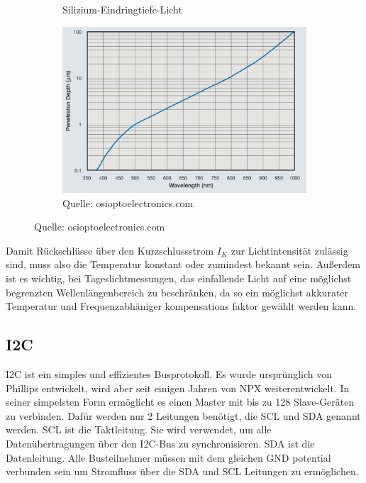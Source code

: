 \begin{figure}[H]
\begin{subfigure}[b]{0.6\textwidth}
    \caption{Silizium-Eindringtiefe-Licht}
    \includegraphics[width=\textwidth]{img/Silizium-Eindringtiefe-Licht.png}
    \caption*{Quelle: osioptoelectronics.com}
  \label{fig:Silizium-eindingtiefe}
  \end{subfigure}
\end{figure}







\noindent Damit Rückschlüsse über den Kurzschlussstrom $I_K$ zur Lichtintensität zulässig sind, muss also die Temperatur konstant oder zumindest bekannt sein.
Außerdem ist es wichtig, bei Tageslichtmessungen, das einfallende Licht auf eine möglichst begrenzten Wellenlängenbereich zu beschränken, da so ein möglichst akkurater Temperatur und Frequenzabhäniger kompensations faktor gewählt werden kann.
\subsection{I2C}
I2C ist ein simples und effizientes Busprotokoll.
Es wurde ursprünglich von Phillips entwickelt, wird aber seit einigen Jahren von NPX weiterentwickelt.
In seiner simpelsten Form ermöglicht es einen Master mit bis zu 128 Slave-Geräten zu verbinden.
Dafür werden nur 2 Leitungen benötigt, die SCL und SDA genannt werden. SCL ist die Taktleitung. Sie wird verwendet, um alle Datenübertragungen über den I2C-Bus zu synchronisieren. SDA ist die Datenleitung.
Alle Busteilnehmer müssen mit dem gleichen GND potential verbunden sein um Stromfluss über die SDA und SCL Leitungen zu ermöglichen\cite{i2b-bus_org}.\\


